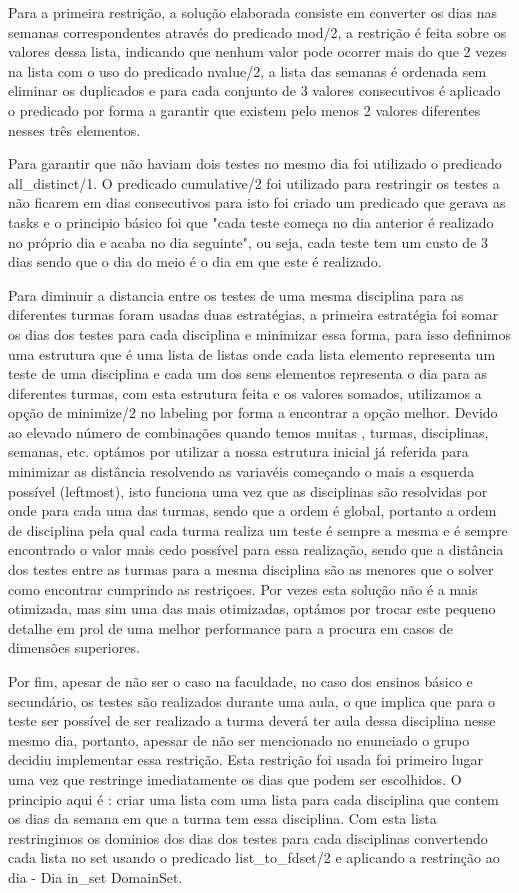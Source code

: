 \documentclass{llncs}
\begin{document}
Para a primeira restrição, a solução elaborada consiste em converter os dias nas semanas correspondentes através do predicado mod/2, a restrição é feita sobre os valores dessa lista, indicando que nenhum valor pode ocorrer mais do que 2 vezes na lista com o uso do predicado nvalue/2, a lista das semanas é ordenada sem eliminar os duplicados e para cada conjunto de 3 valores consecutivos é aplicado o predicado por forma a garantir que existem pelo menos 2 valores diferentes nesses três elementos.

Para garantir que não haviam dois testes no mesmo dia foi utilizado o predicado all\_distinct/1. O predicado cumulative/2 foi utilizado para restringir os testes a não ficarem em dias consecutivos para isto foi criado um predicado que gerava as tasks e o principio básico foi que "cada teste começa no dia anterior é realizado no próprio dia e acaba no dia seguinte", ou seja, cada teste tem um custo de 3 dias sendo que o dia do meio é o dia em que este é realizado.

Para diminuir a distancia entre os testes de uma mesma disciplina para as diferentes turmas foram usadas duas estratégias, a primeira estratégia foi somar os dias dos testes para cada disciplina e minimizar essa forma, para isso definimos uma estrutura que é uma lista de listas onde cada lista elemento representa um teste de uma disciplina e cada um dos seus elementos representa o dia para as diferentes turmas, com esta estrutura feita e os valores somados, utilizamos a opção de minimize/2 no labeling por forma a encontrar a opção melhor. Devido ao elevado número de combinações quando temos muitas , turmas, disciplinas, semanas, etc. optámos por utilizar a nossa estrutura inicial já referida para minimizar as distância resolvendo as variavéis começando o mais a esquerda possível (leftmost), isto funciona uma vez que as disciplinas são resolvidas por onde para cada uma das turmas, sendo que a ordem é global, portanto a ordem de disciplina pela qual cada turma realiza um teste é sempre a mesma e é sempre encontrado o valor mais cedo possível para essa realização, sendo que a distância dos testes entre as turmas para a mesma disciplina são as menores que o solver como encontrar cumprindo as restriçoes. Por vezes esta solução não é a mais otimizada, mas sim uma das mais otimizadas, optámos por trocar este pequeno detalhe em prol de uma melhor performance para a procura em casos de dimensões superiores.

Por fim, apesar de não ser o caso na faculdade, no caso dos ensinos básico e secundário, os testes são realizados durante uma aula, o que implica que para o teste ser possível de ser realizado a turma deverá ter aula dessa disciplina nesse mesmo dia, portanto, apessar de não ser mencionado no enunciado o grupo decidiu implementar essa restrição. Esta restrição foi usada foi primeiro lugar uma vez que restringe imediatamente os dias que podem ser escolhidos. O principio aqui é : criar uma lista com uma lista para cada disciplina que contem os dias da semana em que a turma tem essa disciplina. Com esta lista restringimos os dominios dos dias dos testes para cada disciplinas convertendo cada lista no set usando o predicado list\_to\_fdset/2  e aplicando a restrinção ao dia - Dia in\_set DomainSet.
\end{document}
